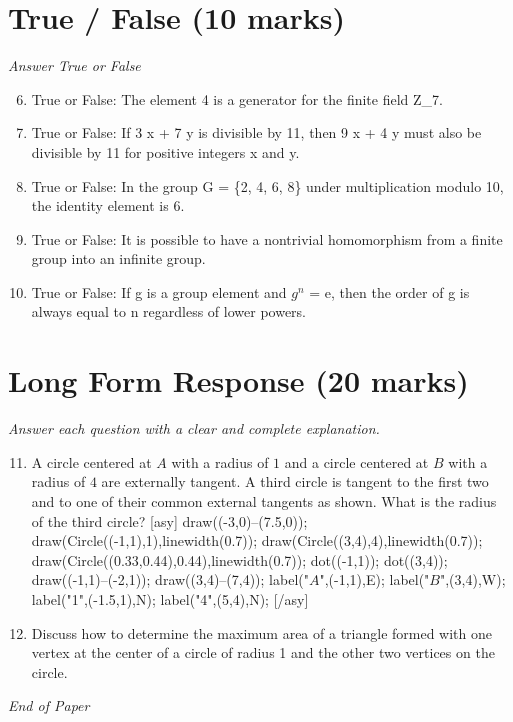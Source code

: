 \documentclass[12pt]{article}
\begin{document}
\section*{True / False (10 marks)}
\textit{Answer True or False}
\begin{enumerate}[label=\arabic*.]
\setcounter{enumi}{5}
\item True or False: The element 4 is a generator for the finite field Z\_7.
\item True or False: If 3 x + 7 y is divisible by 11, then 9 x + 4 y must also be divisible by 11 for positive integers x and y.
\item True or False: In the group G = \{2, 4, 6, 8\} under multiplication modulo 10, the identity element is 6.
\item True or False: It is possible to have a nontrivial homomorphism from a finite group into an infinite group.
\item True or False: If g is a group element and $g^n$ = e, then the order of g is always equal to n regardless of lower powers.
\end{enumerate}

\section*{Long Form Response (20 marks)}
\textit{Answer each question with a clear and complete explanation.}
\begin{enumerate}[label=\arabic*.]
\setcounter{enumi}{10}
\item A circle centered at $A$ with a radius of $1$ and a circle centered at $B$ with a radius of $4$ are externally tangent. A third circle is tangent to the first two and to one of their common external tangents as shown. What is the radius of the third circle? [asy] draw((-3,0)--(7.5,0)); draw(Circle((-1,1),1),linewidth(0.7)); draw(Circle((3,4),4),linewidth(0.7)); draw(Circle((0.33,0.44),0.44),linewidth(0.7)); dot((-1,1)); dot((3,4)); draw((-1,1)--(-2,1)); draw((3,4)--(7,4)); label("$A$",(-1,1),E); label("$B$",(3,4),W); label("1",(-1.5,1),N); label("4",(5,4),N); [/asy]
\item Discuss how to determine the maximum area of a triangle formed with one vertex at the center of a circle of radius 1 and the other two vertices on the circle.
\end{enumerate}

\vfill
\noindent\textit{End of Paper}
\end{document}
